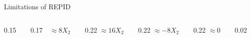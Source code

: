 \documentclass[10pt,compress,t,notes=noshow,xcolor=table]{beamer}
\newcommand{\highlightICE}[1]{\colorbox{cice}{$\displaystyle #1$}}
\newcommand{\highlight}[1]{\colorbox{orange}{$\displaystyle #1$}}
\begin{document}
\begin{framev}[align=top]{Limitations of REPID}
{{\begin{footnotesize}
\begin{columns}[T,totalwidth=\linewidth]
\begin{column}{0.15\linewidth}
\end{column}
\begin{column}{0.17\linewidth}
$\text{    } \approx 8X_2$ %
\end{column}
\begin{column}{0.22\linewidth}
\centering
$\approx 16X_2$ %
\end{column}
\begin{column}{0.22\linewidth}
\centering
$ \approx -8X_2$ %
\end{column}
\begin{column}{0.22\linewidth}
\centering
$\approx 0$%
\end{column}
\begin{column}{0.02\linewidth}
\end{column}
\end{columns}
\end{footnotesize}
}
\spacer[0]
}
\end{framev}
\end{document}
